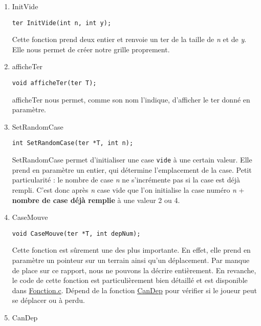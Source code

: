 \documentclass[letter]{article}
\begin{document}
\begin{enumerate}
\item InitVide
\label{sec:org62d41b5}

\begin{verbatim}
ter InitVide(int n, int y);
\end{verbatim}

Cette fonction prend deux entier et renvoie un ter de la taille de \emph{n} et de \emph{y}.
Elle nous permet de créer notre grille proprement.

\item afficheTer
\label{sec:orgf2a5f00}

\begin{verbatim}
void afficheTer(ter T);
\end{verbatim}

afficheTer nous permet, comme son nom l'indique, d'afficher le ter donné en paramètre.

\item SetRandomCase
\label{sec:orga9ef16f}

\begin{verbatim}
int SetRandomCase(ter *T, int n);
\end{verbatim}

SetRandomCase permet d'initialiser une case \texttt{vide} à une certain valeur. Elle prend en paramètre un entier, qui détermine l'emplacement de la case. Petit particularité : le nombre de case \emph{n} ne s'incrémente pas si la case est déjà rempli. C'est donc après \emph{n} case vide que l'on initialise la case numéro \emph{n} + \textbf{nombre de case déjà remplie} à une valeur 2 ou 4.

\item CaseMouve
\label{sec:org0c230d8}

\begin{verbatim}
void CaseMouve(ter *T, int depNum);
\end{verbatim}

Cette fonction est sûrement une des plus importante. En effet, elle prend en paramètre un pointeur sur un terrain ainsi qu'un déplacement. 
Par manque de place sur ce rapport, nous ne pouvons la décrire entièrement. En revanche, le code de cette fonction est particulièrement bien détaillé et est disponible dans \href{FonctionJeu.c}{Fonction.c}.
Dépend de la fonction \hyperref[sec:orgec1067c]{CanDep} pour vérifier si le joueur peut se déplacer ou à perdu.

\item CanDep
\label{sec:orgec1067c}


\end{enumerate}
\end{document}
